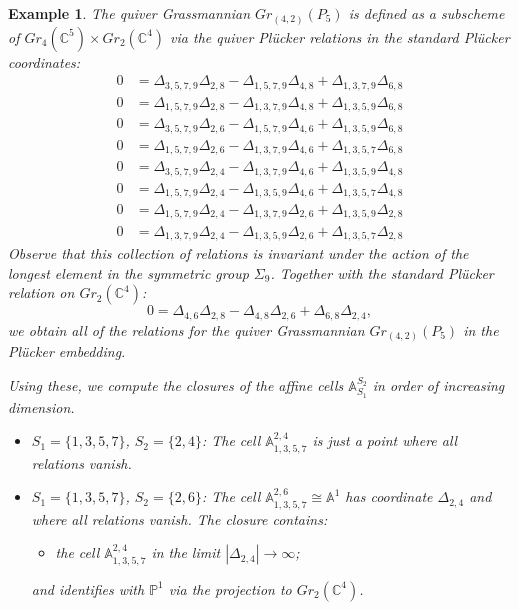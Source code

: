 \documentclass{amsart}
\newtheorem{example}[theorem]{Example}
\numberwithin{equation}{section}
\renewcommand{\AA}{\mathbb{A}}
\newcommand{\CC}{\mathbb{C}}
\newcommand{\PP}{\mathbb{P}}
\begin{document}
  \begin{example}
    The quiver Grassmannian $Gr_{(4,2)}(P_5)$ is defined as a subscheme of $Gr_4(\CC^5)\times Gr_2(\CC^4)$ via the quiver Pl\"ucker relations in the standard Pl\"ucker coordinates:
    \begin{align*}
      0 &= \Delta_{3,5,7,9} \Delta_{2,8} - \Delta_{1,5,7,9}\Delta_{4,8} + \Delta_{1,3,7,9}\Delta_{6,8}\\
      0 &= \Delta_{1,5,7,9}\Delta_{2,8} - \Delta_{1,3,7,9}\Delta_{4,8} + \Delta_{1,3,5,9}\Delta_{6,8}\\
      0 &= \Delta_{3,5,7,9} \Delta_{2,6} - \Delta_{1,5,7,9}\Delta_{4,6} + \Delta_{1,3,5,9}\Delta_{6,8}\\
      0 &= \Delta_{1,5,7,9}\Delta_{2,6} - \Delta_{1,3,7,9}\Delta_{4,6} + \Delta_{1,3,5,7}\Delta_{6,8}\\
      0 &= \Delta_{3,5,7,9} \Delta_{2,4} - \Delta_{1,3,7,9}\Delta_{4,6} + \Delta_{1,3,5,9}\Delta_{4,8}\\
      0 &= \Delta_{1,5,7,9}\Delta_{2,4} - \Delta_{1,3,5,9}\Delta_{4,6} + \Delta_{1,3,5,7}\Delta_{4,8}\\
      0 &= \Delta_{1,5,7,9}\Delta_{2,4} - \Delta_{1,3,7,9}\Delta_{2,6} + \Delta_{1,3,5,9}\Delta_{2,8}\\
      0 &= \Delta_{1,3,7,9}\Delta_{2,4} - \Delta_{1,3,5,9}\Delta_{2,6} + \Delta_{1,3,5,7}\Delta_{2,8}
    \end{align*}
    Observe that this collection of relations is invariant under the action of the longest element in the symmetric group $\Sigma_9$.
    Together with the standard Pl\"ucker relation on $Gr_2(\CC^4)$:
    \begin{equation*}
      0 = \Delta_{4,6}\Delta_{2,8} - \Delta_{4,8}\Delta_{2,6} + \Delta_{6,8}\Delta_{2,4},
    \end{equation*}
    we obtain all of the relations for the quiver Grassmannian $Gr_{(4,2)}(P_5)$ in the Pl\"ucker embedding.

    Using these, we compute the closures of the affine cells $\AA_{S_1}^{S_2}$ in order of increasing dimension.
    \begin{itemize}
      \item $S_1=\{1,3,5,7\}$, $S_2=\{2,4\}$: The cell $\AA_{1,3,5,7}^{2,4}$ is just a point where all relations vanish.

      \item $S_1=\{1,3,5,7\}$, $S_2=\{2,6\}$: The cell $\AA_{1,3,5,7}^{2,6} \cong \AA^1$ has coordinate $\Delta_{2,4}$ and where all relations vanish.
        The closure contains:
        \begin{itemize}
          \item the cell $\AA_{1,3,5,7}^{2,4}$ in the limit $|\Delta_{2,4}|\to\infty$;
        \end{itemize}
        and identifies with $\PP^1$ via the projection to $Gr_2(\CC^4)$.


\end{itemize}
\end{example}
\end{document}
